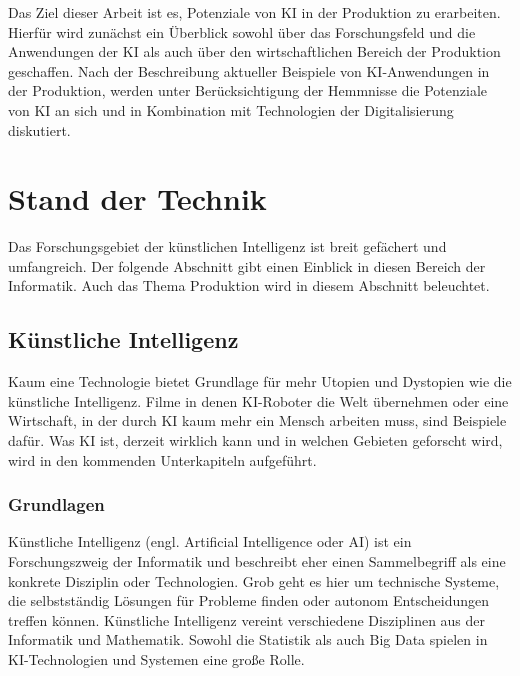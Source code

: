 \documentclass[a4paper,12pt, german]{report}
\begin{document}
Das Ziel dieser Arbeit ist es, Potenziale von KI in der Produktion zu erarbeiten. Hierfür wird zunächst ein Überblick sowohl über das Forschungsfeld und die Anwendungen der KI als auch über den wirtschaftlichen Bereich der Produktion geschaffen. Nach der Beschreibung aktueller Beispiele von KI-Anwendungen in der Produktion, werden unter Berücksichtigung der Hemmnisse die Potenziale von KI an sich und in Kombination mit Technologien der Digitalisierung diskutiert.


\chapter{Stand der Technik}

Das Forschungsgebiet der künstlichen Intelligenz ist breit gefächert und umfangreich. Der folgende Abschnitt gibt einen Einblick in diesen Bereich der Informatik. Auch das Thema Produktion wird in diesem Abschnitt beleuchtet.

\section{Künstliche Intelligenz}

Kaum eine Technologie bietet Grundlage für mehr Utopien und Dystopien wie die künstliche Intelligenz. Filme in denen KI-Roboter die Welt übernehmen oder eine Wirtschaft, in der durch KI kaum mehr ein Mensch arbeiten muss, sind Beispiele dafür. Was KI ist, derzeit wirklich kann und in welchen Gebieten geforscht wird, wird in den kommenden Unterkapiteln aufgeführt. 

\subsection{Grundlagen}

Künstliche Intelligenz (engl. Artificial Intelligence oder AI) ist ein Forschungszweig der Informatik und beschreibt eher einen Sammelbegriff als eine konkrete Disziplin oder Technologien. Grob geht es hier um technische Systeme, die selbstständig Lösungen für Probleme finden oder autonom Entscheidungen treffen können.\cite{01}\cite{10}\newline
Künstliche Intelligenz vereint verschiedene Disziplinen aus der Informatik und Mathematik. Sowohl die Statistik als auch Big Data spielen in KI-Technologien und Systemen eine große Rolle.\cite{17}
\end{document}

